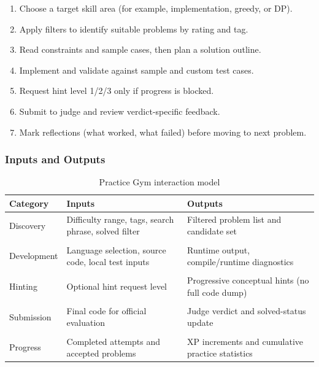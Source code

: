 \documentclass[12pt]{article}
\begin{document}
\begin{enumerate}
\item Choose a target skill area (for example, implementation, greedy, or DP).
\item Apply filters to identify suitable problems by rating and tag.
\item Read constraints and sample cases, then plan a solution outline.
\item Implement and validate against sample and custom test cases.
\item Request hint level 1/2/3 only if progress is blocked.
\item Submit to judge and review verdict-specific feedback.
\item Mark reflections (what worked, what failed) before moving to next problem.
\end{enumerate}

\subsubsection{Inputs and Outputs}

\begin{table}[ht]
\centering
\begin{tabularx}{\textwidth}{>{\raggedright\arraybackslash}p{3.2cm} >{\raggedright\arraybackslash}X >{\raggedright\arraybackslash}X}
\toprule
\textbf{Category} & \textbf{Inputs} & \textbf{Outputs} \\
\midrule
Discovery & Difficulty range, tags, search phrase, solved filter & Filtered problem list and candidate set \\ \\
Development & Language selection, source code, local test inputs & Runtime output, compile/runtime diagnostics \\ \\
Hinting & Optional hint request level & Progressive conceptual hints (no full code dump) \\ \\
Submission & Final code for official evaluation & Judge verdict and solved-status update \\ \\ 
Progress & Completed attempts and accepted problems & XP increments and cumulative practice statistics \\
\bottomrule
\end{tabularx}
\caption{Practice Gym interaction model}
\end{table}
\end{document}
